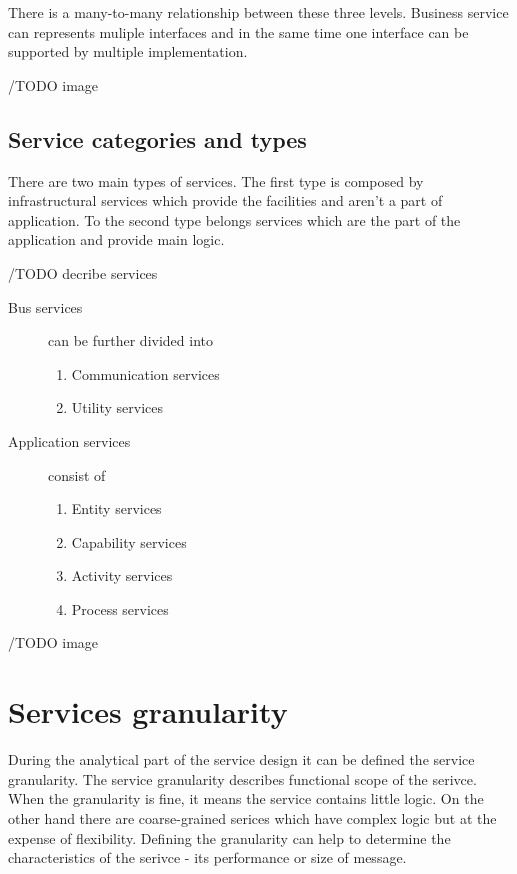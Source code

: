 There is a many-to-many relationship between these three levels. Business service can represents muliple interfaces and in the same time one interface can be supported by multiple implementation.

/TODO image

\subsection{Service categories and types} \cite{website:ontology-taxonomy}

There are two main types of services. The first type is composed by infrastructural services which provide the facilities and aren't a part of application. To the second type belongs services which are the part of the application and provide main logic.

/TODO decribe services

\begin{description}
  \item[Bus services] can be further divided into 
  \begin{enumerate}
    \item Communication services 
    \item Utility services
  \end{enumerate}
  \item[Application services] consist of   
  \begin{enumerate}
    \item Entity services
    \item Capability services
    \item Activity services
    \item Process services
  \end{enumerate}
\end{description}

/TODO image

\section{Services granularity}
\label{sec:granularity}
During the analytical part of the service design it can be defined the service granularity. The service granularity describes functional scope of the serivce. When the granularity is fine, it means the service contains little logic. On the other hand there are coarse-grained serices which have complex logic but at the expense of flexibility.
Defining the granularity can help to determine the characteristics of the serivce - its performance or size of message. \cite{soa-contract}

